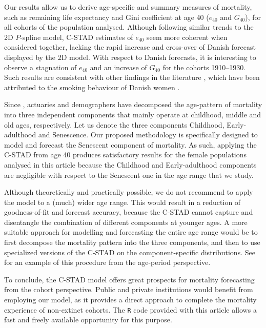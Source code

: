 \documentclass[11pt, a4paper]{article}
\begin{document}
Our results allow us to derive age-specific and summary measures of mortality, such as remaining life expectancy and Gini coefficient at age 40 ($e_{40}$ and $G_{40}$), for all cohorts of the population analysed. Although following similar trends to the 2D $P$-spline model, C-STAD estimates of $e_{40}$ seem more coherent when considered together, lacking the rapid increase and cross-over of Danish forecast displayed by the 2D model. With respect to Danish forecasts, it is interesting to observe a stagnation of $e_{40}$ and an increase of $G_{40}$ for the cohorts 1910--1930. Such results are consistent with other findings in the literature \cite[see, e.g., Fig.~4 in][]{jacobsen2002long}, which have been attributed to the smoking behaviour of Danish women \citep{jacobsen2006causes,lindahl2016did}. 

{\color{red}
Since \cite{thiele1871mathematical}, actuaries and demographers have decomposed the age-pattern of mortality into three independent components that mainly operate at childhood, middle and old ages, respectively. Let us denote the three components Childhood, Early-adulthood and Senescence. Our proposed methodology is specifically designed to model and forecast the Senescent component of mortality. As such, applying the C-STAD from age 40 produces satisfactory results for the female populations analysed in this article because the Childhood and Early-adulthood components are negligible with respect to the Senescent one in the age range that we study. 
	
Although theoretically and practically possible, we do not recommend to apply the model to a (much) wider age range. This would result in a reduction of goodness-of-fit and forecast accuracy, because the C-STAD cannot capture and disentangle the combination of different components at younger ages. A more suitable approach for modelling and forecasting the entire age range would be to first decompose the mortality pattern into the three components, and then to use specialized versions of the C-STAD on the component-specific distributions. See \cite{basellini2019three} for an example of this procedure from the age-period perspective.

}

To conclude, the C-STAD model offers great prospects for mortality forecasting from the cohort perspective. {\color{red}Public and private institutions would benefit from employing our model, as it} provides a direct approach to complete the mortality experience  of non-extinct cohorts. The \texttt{R} code provided with this article allows a fast and freely available opportunity for this purpose. 
\end{document}
